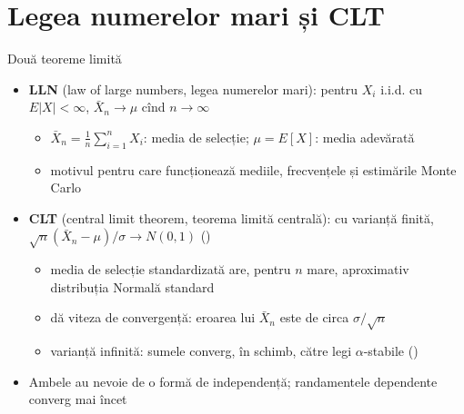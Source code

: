 \section{Legea numerelor mari și CLT}

\begin{frame}{Două teoreme limită}
\itemsize{\small}
\begin{itemize}
    \item \textbf{LLN} (law of large numbers, legea numerelor mari): pentru $X_i$ i.i.d. cu $E|X| < \infty$, $\bar X_n \to \mu$ cînd $n \to \infty$
    \begin{itemize}
        \item $\bar X_n = \frac1n\sum_{i=1}^n X_i$: media de selecție; $\mu = E[X]$: media adevărată
        \item motivul pentru care funcționează mediile, frecvențele și estimările Monte Carlo
    \end{itemize}
    \item \textbf{CLT} (central limit theorem, teorema limită centrală): cu varianță finită, $\sqrt{n}(\bar X_n - \mu)/\sigma \to N(0, 1)$ ()
    \begin{itemize}
        \item media de selecție standardizată are, pentru $n$ mare, aproximativ distribuția Normală standard
        \item dă viteza de convergență: eroarea lui $\bar X_n$ este de circa $\sigma/\sqrt{n}$
        \item varianță infinită: sumele converg, în schimb, către legi $\alpha$-stabile ()
    \end{itemize}
    \item Ambele au nevoie de o formă de independență; randamentele dependente converg mai încet
\end{itemize}
\end{frame}


